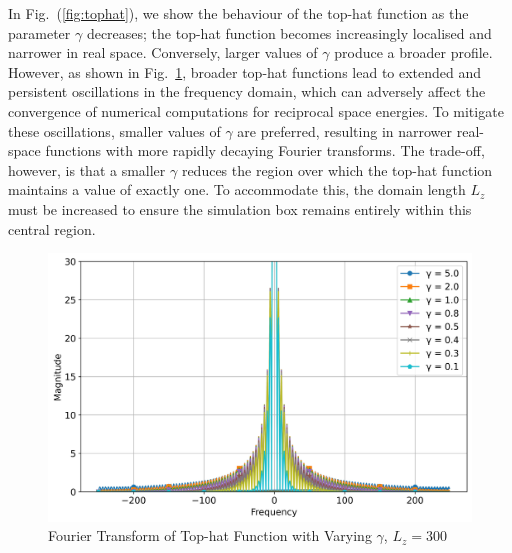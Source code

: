 In Fig.~(\ref{fig:tophat}), we show the behaviour of the top-hat function  as the parameter $\gamma$ decreases; the top-hat function becomes increasingly localised and narrower in real space. Conversely, larger values of $\gamma$ produce a broader profile. However, as shown in Fig.~\ref{fig:fourieroftophatvarygammaL300}, broader top-hat functions lead to extended and persistent oscillations in the frequency domain, which can adversely affect the convergence of numerical computations for reciprocal space energies. To mitigate these oscillations, smaller values of $\gamma$ are preferred, resulting in narrower real-space functions with more rapidly decaying Fourier transforms. The trade-off, however, is that a smaller $\gamma$ reduces the region over which the top-hat function maintains a value of exactly one. To accommodate this, the domain length $L_z$ must be increased to ensure the simulation box remains entirely within this central region.

\begin{figure}[htbp]
  \centering
  \includegraphics[width=\linewidth]{images/fourieroftophatvarygammaL300.jpg}
  \caption{Fourier Transform of Top-hat Function with Varying $\gamma$, $L_z = 300$}
  \label{fig:fourieroftophatvarygammaL300}
\end{figure}
  

